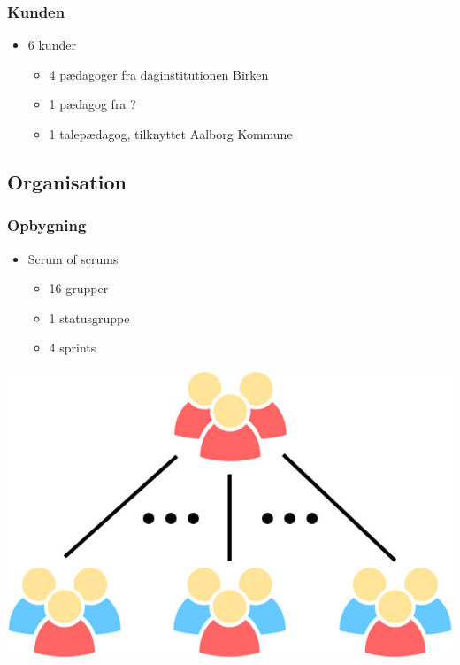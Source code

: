 \begin{frame}
\frametitle{Kunden}

\begin{itemize}
\item 6 kunder
\begin{itemize}
\item 4 pædagoger fra daginstitutionen Birken
\item 1 pædagog fra ?
\item 1 talepædagog, tilknyttet Aalborg Kommune
\end{itemize}
\end{itemize}

\end{frame}

\subsection{Organisation}

\begin{frame}
\frametitle{Opbygning}

\begin{itemize}
\item Scrum of scrums
\begin{itemize}
\item 16 grupper
\item 1 statusgruppe
\item 4 sprints
\end{itemize}
\end{itemize}

\centering\includegraphics[height=.5\textheight]{pgraphics/scrum-of-scrums}

\end{frame}

